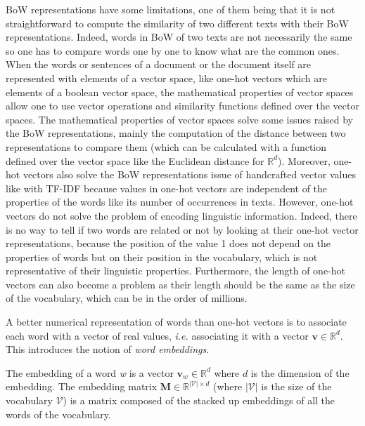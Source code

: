   BoW representations have some limitations, one of them being that it is not
  straightforward to compute the similarity of two different texts with their
  BoW representations. Indeed, words in BoW of two texts are not necessarily the
  same so one has to compare words one by one to know what are the common ones.
  When the words or sentences of a document or the document itself are
  represented with elements of a vector space, like one-hot vectors which are
  elements of a boolean vector space, the mathematical properties of vector
  spaces allow one to use vector operations and similarity functions defined
  over the vector spaces. The mathematical properties of vector spaces solve
  some issues raised by the BoW representations, mainly the computation of the
  distance between two representations to compare them (which can be calculated
  with a function defined over the vector space like the Euclidean distance for
  $\mathbb{R}^d$). Moreover, one-hot vectors also solve the BoW representations
  issue of handcrafted vector values like with TF-IDF because values in one-hot
  vectors are independent of the properties of the words like its number of
  occurrences in texts. However, one-hot vectors do not solve the problem of
  encoding linguistic information. Indeed, there is no way to tell if two words
  are related or not by looking at their one-hot vector representations, because
  the position of the value 1 does not depend on the properties of words but
  on their position in the vocabulary, which is not representative of their
  linguistic properties. Furthermore, the length of one-hot vectors can also
  become a problem as their length should be the same as the size of the
  vocabulary, which can be in the order of millions.

  A better numerical representation of words than one-hot vectors is to
  associate each word with a vector of real values, \textit{i.e.} associating it
  with a vector $\mathbf{v} \in \mathbb{R}^d$. This introduces the notion of
  \textit{word embeddings}.

  \theoremstyle{definition}
  \begin{definition}
    \label{ch01:def:def-word-embedding}
    The embedding of a word \textit{w} is a vector $\mathbf{v}_w \in
    \mathbb{R}^d$ where $d$ is the dimension of the embedding. The embedding
    matrix $\mathbf{M} \in \mathbb{R}^{|\mathcal{V}| \times d}$ (where
    $|\mathcal{V}|$ is the size of the vocabulary $\mathcal{V}$) is a matrix
    composed of the stacked up embeddings of all the words of the vocabulary.
  \end{definition}

